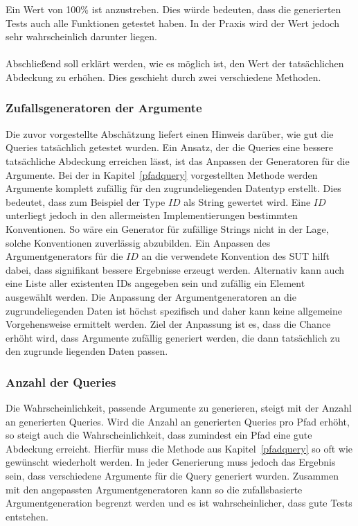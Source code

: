 Ein Wert von 100\% ist anzustreben.
Dies würde bedeuten, dass die generierten Tests auch alle Funktionen getestet haben.
In der Praxis wird der Wert jedoch sehr wahrscheinlich darunter liegen.
\\
\\

Abschließend soll erklärt werden, wie es möglich ist, den Wert der tatsächlichen Abdeckung zu erhöhen.
Dies geschieht durch zwei verschiedene Methoden.

\subsubsection{Zufallsgeneratoren der Argumente}
\label{zufallsgen}

Die zuvor vorgestellte Abschätzung liefert einen Hinweis darüber, wie gut die Queries tatsächlich getestet wurden.
Ein Ansatz, der die Queries eine bessere tatsächliche Abdeckung erreichen lässt, ist das Anpassen der Generatoren für die Argumente.
Bei der in Kapitel~\ref{pfadquery} vorgestellten Methode werden Argumente komplett zufällig für den zugrundeliegenden Datentyp erstellt.
Dies bedeutet, dass zum Beispiel der Type $ID$ als String gewertet wird.
Eine $ID$ unterliegt jedoch in den allermeisten Implementierungen bestimmten Konventionen.
So wäre ein Generator für zufällige Strings nicht in der Lage, solche Konventionen zuverlässig abzubilden.
Ein Anpassen des Argumentgenerators für die $ID$ an die verwendete Konvention des SUT hilft dabei, dass signifikant bessere Ergebnisse erzeugt werden.
Alternativ kann auch eine Liste aller existenten IDs angegeben sein und zufällig ein Element ausgewählt werden.
Die Anpassung der Argumentgeneratoren an die zugrundeliegenden Daten ist höchst spezifisch und daher kann keine allgemeine
Vorgehensweise ermittelt werden.
Ziel der Anpassung ist es, dass die Chance erhöht wird, dass Argumente zufällig generiert werden, die dann tatsächlich zu den zugrunde liegenden Daten passen.

\subsubsection{Anzahl der Queries}

Die Wahrscheinlichkeit, passende Argumente zu generieren, steigt mit der Anzahl an generierten Queries.
Wird die Anzahl an generierten Queries pro Pfad erhöht, so steigt auch die Wahrscheinlichkeit, dass zumindest ein Pfad eine gute Abdeckung erreicht.
Hierfür muss die Methode aus Kapitel~\ref{pfadquery} so oft wie gewünscht wiederholt werden.
In jeder Generierung muss jedoch das Ergebnis sein, dass verschiedene Argumente für die Query generiert wurden.
Zusammen mit den angepassten Argumentgeneratoren kann so die zufallsbasierte Argumentgeneration begrenzt werden
und es ist wahrscheinlicher, dass gute Tests entstehen.



